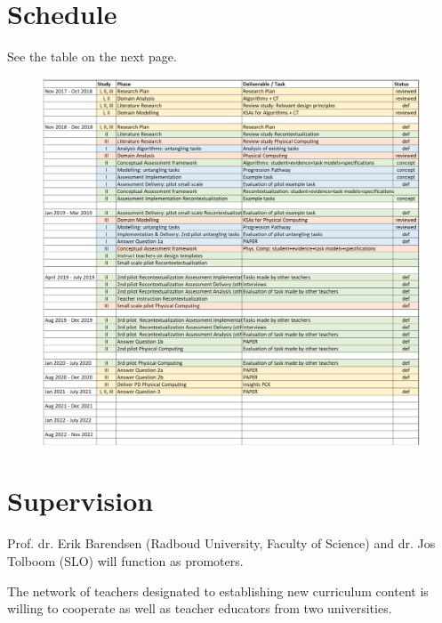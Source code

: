 
\section{Schedule}\label{sec:Schedule}

See the table on the next page.

\begin{figure}
\includegraphics[scale=1.0]{figures/schedule.png}
\end{figure}


\section{Supervision}\label{sec:Supervision}

Prof. dr. Erik Barendsen (Radboud University, Faculty of Science) and dr. Jos Tolboom (SLO) will function as promoters.


The network of teachers designated to establishing new curriculum content is willing to cooperate as well as teacher educators from two universities.

